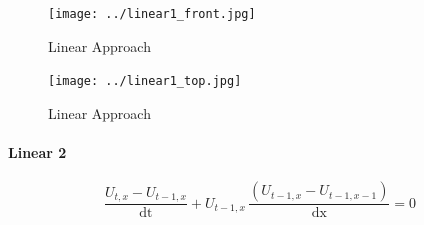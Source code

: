 \documentclass[12pt]{article}
\begin{document}

        \begin{figure}[!ht]
            \begin{minipage}[b]{0.5\textwidth}
              \texttt{[image: ../linear1\_front.jpg]}
              \caption{Linear Approach}
              \label{fig:STDL}
            \end{minipage}
            \begin{minipage}[b]{0.5\textwidth}
              \texttt{[image: ../linear1\_top.jpg]}
              \caption{Linear Approach}
              \label{fig:STDL}
            \end{minipage}
        \end{figure}
        \newpage

    \paragraph{Linear 2}

        \begin{equation}
            \frac{U_{t,x}-U_{t-1,x}}{\mathrm{dt}}+ U_{t-1,x}\, \frac{\left(U_{t-1,x}-U_{t-1,x-1}\right)}{\mathrm{dx}}=0
        \end{equation}
\end{document}
